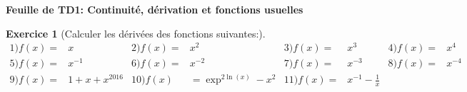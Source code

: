 \documentclass{article}%
\theoremstyle{exercice}
\newtheorem{exercice}{Exercice}
\begin{document}
\begin{center}
  \textbf{Feuille de TD1: Continuité, dérivation et fonctions usuelles}
\end{center}

\begin{exercice}[Calculer les dérivées  des fonctions suivantes:]
  $\begin{aligned}
    1) f(x) =& x & 2) f(x) =& x^2 & 3) f(x) =& x^3 & 4) f(x) =& x^4 \\
    5) f(x) =& x^{-1} & 6) f(x) =& x^{-2} & 7) f(x) =& x^{-3} & 8)
    f(x)=&x^{-4}\\
    9) f(x) =& 1 + x + x^{2016} & 10)f(x)&=\exp^{2\ln(x)} - x^2 &11) f(x) =& x^{-1} - \frac{1}{x} 
  \end{aligned}$
\end{exercice}
\end{document}
